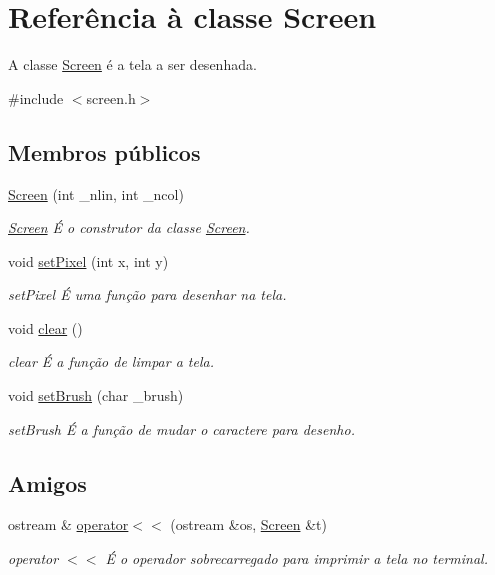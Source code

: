 \hypertarget{class_screen}{}\section{Referência à classe Screen}
\label{class_screen}


A classe \mbox{\hyperlink{class_screen}{Screen}} é a tela a ser desenhada.  




{\ttfamily \#include $<$screen.\+h$>$}

\subsection*{Membros públicos}
\begin{DoxyCompactItemize}
\item 
\mbox{\hyperlink{class_screen_a6c21beca43d25854d8674445127ef2eb}{Screen}} (int \+\_\+nlin, int \+\_\+ncol)
\begin{DoxyCompactList}\small\item\em \mbox{\hyperlink{class_screen}{Screen}} É o construtor da classe \mbox{\hyperlink{class_screen}{Screen}}. \end{DoxyCompactList}\item 
void \mbox{\hyperlink{class_screen_ae6bea81c57a22d226507c3c26fa95ee0}{set\+Pixel}} (int x, int y)
\begin{DoxyCompactList}\small\item\em set\+Pixel É uma função para desenhar na tela. \end{DoxyCompactList}\item 
void \mbox{\hyperlink{class_screen_a35e74266b2a04e37b354ceff7a5f1031}{clear}} ()
\begin{DoxyCompactList}\small\item\em clear É a função de limpar a tela. \end{DoxyCompactList}\item 
void \mbox{\hyperlink{class_screen_aebc4eb6cb5acf15a0f04c1494622ab23}{set\+Brush}} (char \+\_\+brush)
\begin{DoxyCompactList}\small\item\em set\+Brush É a função de mudar o caractere para desenho. \end{DoxyCompactList}\end{DoxyCompactItemize}
\subsection*{Amigos}
\begin{DoxyCompactItemize}
\item 
ostream \& \mbox{\hyperlink{class_screen_aab6a2880746bfe1b7964817cc8f0989e}{operator$<$$<$}} (ostream \&os, \mbox{\hyperlink{class_screen}{Screen}} \&t)
\begin{DoxyCompactList}\small\item\em operator $<$$<$ É o operador sobrecarregado para imprimir a tela no terminal. \end{DoxyCompactList}\end{DoxyCompactItemize}


